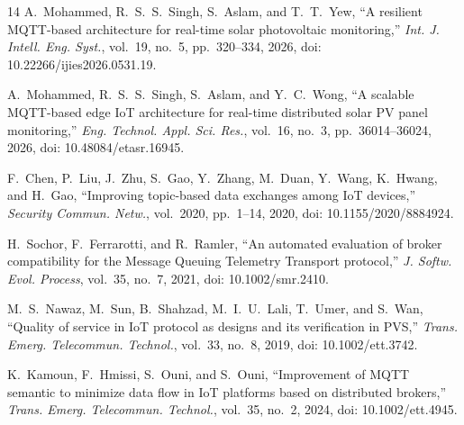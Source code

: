 \documentclass[journal]{IEEEtran}
\begin{document}
\begin{thebibliography}{14}
A.~Mohammed, R.~S.~S.~Singh, S.~Aslam, and T.~T.~Yew,
``A resilient MQTT-based architecture for real-time solar photovoltaic monitoring,''
\emph{Int. J. Intell. Eng. Syst.}, vol.~19, no.~5, pp.~320--334, 2026,
doi: 10.22266/ijies2026.0531.19.

A.~Mohammed, R.~S.~S.~Singh, S.~Aslam, and Y.~C.~Wong,
``A scalable MQTT-based edge IoT architecture for real-time distributed solar PV panel monitoring,''
\emph{Eng. Technol. Appl. Sci. Res.}, vol.~16, no.~3, pp.~36014--36024, 2026,
doi: 10.48084/etasr.16945.

F.~Chen, P.~Liu, J.~Zhu, S.~Gao, Y.~Zhang, M.~Duan, Y.~Wang, K.~Hwang, and H.~Gao,
``Improving topic-based data exchanges among IoT devices,''
\emph{Security Commun. Netw.}, vol.~2020, pp.~1--14, 2020,
doi: 10.1155/2020/8884924.

H.~Sochor, F.~Ferrarotti, and R.~Ramler,
``An automated evaluation of broker compatibility for the Message Queuing Telemetry Transport protocol,''
\emph{J. Softw. Evol. Process}, vol.~35, no.~7, 2021,
doi: 10.1002/smr.2410.

M.~S.~Nawaz, M.~Sun, B.~Shahzad, M.~I.~U.~Lali, T.~Umer, and S.~Wan,
``Quality of service in IoT protocol as designs and its verification in PVS,''
\emph{Trans. Emerg. Telecommun. Technol.}, vol.~33, no.~8, 2019,
doi: 10.1002/ett.3742.

K.~Kamoun, F.~Hmissi, S.~Ouni, and S.~Ouni,
``Improvement of MQTT semantic to minimize data flow in IoT platforms based on distributed brokers,''
\emph{Trans. Emerg. Telecommun. Technol.}, vol.~35, no.~2, 2024,
doi: 10.1002/ett.4945.
\end{thebibliography}
\end{document}
